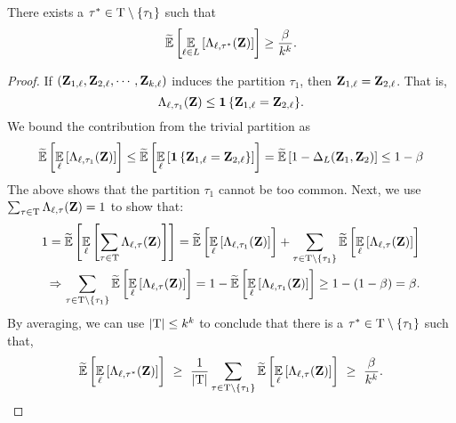 	\begin{claim}\label{claim:best_partition}
		There exists a $\tau^*\in {\mathrm{T}} \setminus \{\tau_1\}$ such that 
		\[
			\tildeEx{\Ex{\li \in L}{\Lambda_{\li, \tau^*}(\zee)}} \geq \frac{\beta}{k^k}.
		\]
	\end{claim}
	\begin{proof}
		If $({ \mathbf{Z} }_{1, { \ell }}, { \mathbf{Z} }_{2, { \ell }}, \cdots , { \mathbf{Z} }_{k, { \ell }})$ induces the partition $\tau_1$, then ${ \mathbf{Z} }_{1,{ \ell }} = { \mathbf{Z} }_{2,{ \ell }}$. That is,
		\[
			\Lambda_{{ \ell },\tau_1}({ \mathbf{Z} }) \leq {{\mathbf{1}}\left\{ { \mathbf{Z} }_{1,{ \ell }} = { \mathbf{Z} }_{2,{ \ell }} \right\} }.
		\]
		We bound the contribution from the trivial partition as 
		\[
			\tildeEx{\Ex{\li}{\Lambda_{\li,\tau_1}(\zee)}} \leq \tildeEx{\Ex{\li}{\indi{\zee_{1,\li} = \zee_{2,\li}}}} = \tildeEx{1-\Delta_L(\zee_1,\zee_2)} \leq 1-\beta
		\]
		The above shows that the partition $\tau_1$ cannot be too common. Next, we use $\sum_{\tau\in {\mathrm{T}}} \Lambda_{{ \ell },\tau}({ \mathbf{Z} }) =1$ to show that:
		\begin{align*}
			1 = \tildeEx{\Ex{\li}{\sum_{\tau \in \Tau}{\Lambda_{\li,\tau}(\zee)}}} = \tildeEx{\Ex{\li}{\Lambda_{\li,\tau_1}(\zee)}} + \sum_{\tau \in \Tau \setminus \{\tau_1\}} \tildeEx{\Ex{\li}{\Lambda_{\li,\tau}(\zee)}} \\
			\implies\sum_{\tau \in \Tau \setminus \{\tau_1\}} \tildeEx{\Ex{\li}{\Lambda_{\li,\tau}(\zee)}} = 1 - \tildeEx{\Ex{\li}{\Lambda_{\li,\tau_1}(\zee)}} \geq 1-(1-\beta) = \beta.
		\end{align*}
		By averaging, we can use $|{\mathrm{T}}| \leq k^k$ to conclude that there is a $\tau^* \in {\mathrm{T}} \setminus \{\tau_1\}$ such that,
		\[
			\tildeEx{\Ex{\li}{\Lambda_{\li,\tau^*}(\zee)}} ~\geq~ \frac{1}{|\Tau|} \sum_{\tau \in \Tau \setminus \{\tau_1\}} \tildeEx{\Ex{\li}{\Lambda_{\li,\tau}(\zee)}} ~\geq~ \frac{\beta}{k^k}.\qedhere
		\]
	\end{proof}
	
